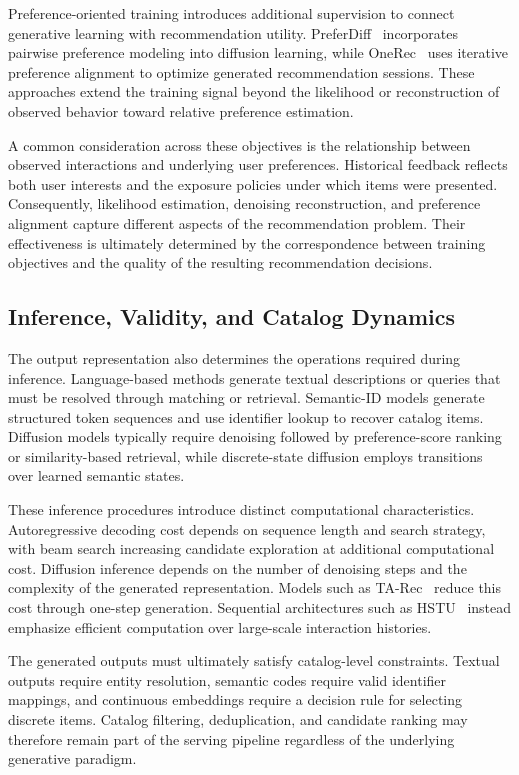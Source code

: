 \documentclass[sigconf,nonacm]{acmart}
\begin{document}
Preference-oriented training introduces additional
supervision to connect generative learning with
recommendation utility. PreferDiff~\cite{preferdiff}
incorporates pairwise preference modeling into
diffusion learning, while OneRec~\cite{onerec}
uses iterative preference alignment to optimize
generated recommendation sessions. These
approaches extend the training signal beyond
the likelihood or reconstruction of observed
behavior toward relative preference estimation.

A common consideration across these objectives
is the relationship between observed interactions
and underlying user preferences. Historical
feedback reflects both user interests and
the exposure policies under which items were
presented. Consequently, likelihood estimation,
denoising reconstruction, and preference alignment
capture different aspects of the recommendation
problem. Their effectiveness is ultimately
determined by the correspondence between
training objectives and the quality of the
resulting recommendation decisions.

\subsection{Inference, Validity, and Catalog Dynamics}

The output representation also determines the
operations required during inference. Language-based
methods generate textual descriptions or queries
that must be resolved through matching or retrieval.
Semantic-ID models generate structured token
sequences and use identifier lookup to recover
catalog items. Diffusion models typically require
denoising followed by preference-score ranking
or similarity-based retrieval, while discrete-state
diffusion employs transitions over learned
semantic states.

These inference procedures introduce distinct
computational characteristics. Autoregressive
decoding cost depends on sequence length and search
strategy, with beam search increasing candidate
exploration at additional computational cost.
Diffusion inference depends on the number of
denoising steps and the complexity of the generated
representation. Models such as TA-Rec~\cite{tarec}
reduce this cost through one-step generation.
Sequential architectures such as HSTU~\cite{hstu}
instead emphasize efficient computation over
large-scale interaction histories.

The generated outputs must ultimately satisfy
catalog-level constraints. Textual outputs require
entity resolution, semantic codes require valid
identifier mappings, and continuous embeddings
require a decision rule for selecting discrete
items. Catalog filtering, deduplication, and
candidate ranking may therefore remain part of
the serving pipeline regardless of the
underlying generative paradigm.
\end{document}
